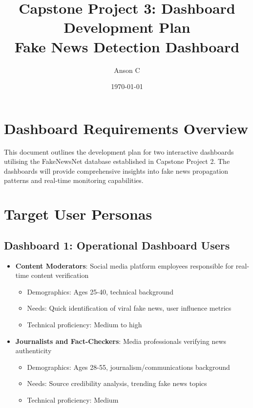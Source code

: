 \documentclass[12pt,a4paper]{article}
\title{Capstone Project 3: Dashboard Development Plan\\
\large Fake News Detection Dashboard}
\author{Anson C}
\date{\today}
\begin{document}
\maketitle

\section{Dashboard Requirements Overview}

This document outlines the development plan for two interactive dashboards utilising the FakeNewsNet database established in Capstone Project 2. The dashboards will provide comprehensive insights into fake news propagation patterns and real-time monitoring capabilities.

\section{Target User Personas}

\subsection{Dashboard 1: Operational Dashboard Users}
\begin{itemize}
    \item \textbf{Content Moderators}: Social media platform employees responsible for real-time content verification
    \begin{itemize}
        \item Demographics: Ages 25-40, technical background
        \item Needs: Quick identification of viral fake news, user influence metrics
        \item Technical proficiency: Medium to high
    \end{itemize}
    
    \item \textbf{Journalists and Fact-Checkers}: Media professionals verifying news authenticity
    \begin{itemize}
        \item Demographics: Ages 28-55, journalism/communications background
        \item Needs: Source credibility analysis, trending fake news topics
        \item Technical proficiency: Medium
    \end{itemize}
\end{itemize}
\end{document}
